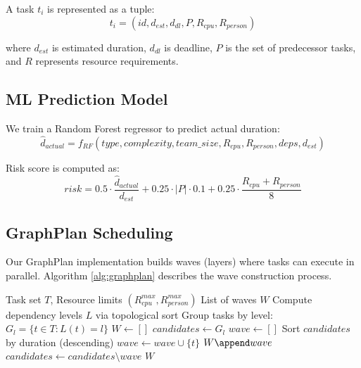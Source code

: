 \documentclass[11pt,a4paper]{article}
\begin{document}
A task $t_i$ is represented as a tuple:
\begin{equation}
t_i = (id, d_{est}, d_{dl}, P, R_{cpu}, R_{person})
\end{equation}

where $d_{est}$ is estimated duration, $d_{dl}$ is deadline, $P$ is the set of predecessor tasks, and $R$ represents resource requirements.

\subsection{ML Prediction Model}

We train a Random Forest regressor to predict actual duration:
\begin{equation}
\hat{d}_{actual} = f_{RF}(type, complexity, team\_size, R_{cpu}, R_{person}, deps, d_{est})
\end{equation}

Risk score is computed as:
\begin{equation}
risk = 0.5 \cdot \frac{\hat{d}_{actual}}{d_{est}} + 0.25 \cdot |P| \cdot 0.1 + 0.25 \cdot \frac{R_{cpu} + R_{person}}{8}
\end{equation}

\subsection{GraphPlan Scheduling}

Our GraphPlan implementation builds waves (layers) where tasks can execute in parallel. Algorithm \ref{alg:graphplan} describes the wave construction process.

\begin{algorithm}
\caption{GraphPlan Wave Construction}
\label{alg:graphplan}
\begin{algorithmic}[1]
\Require Task set $T$, Resource limits $(R_{cpu}^{max}, R_{person}^{max})$
\Ensure List of waves $W$
\State Compute dependency levels $L$ via topological sort
\State Group tasks by level: $G_l = \{t \in T : L(t) = l\}$
\State $W \gets []$
    \State $candidates \gets G_l$
        \State $wave \gets []$
        \State Sort $candidates$ by duration (descending)
                \State $wave \gets wave \cup \{t\}$
            \EndIf
        \EndFor
        \State $W \append wave$
        \State $candidates \gets candidates \setminus wave$
    \EndWhile
\EndFor
\State \Return $W$
\end{algorithmic}
\end{algorithm}
\end{document}
